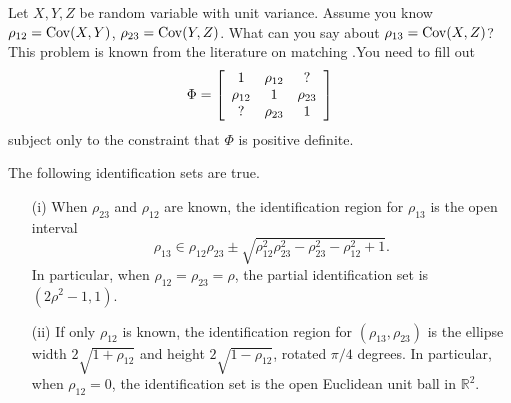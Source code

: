 Let $X,Y,Z$ be random variable with unit variance. Assume you know
$\rho_{12}=\operatorname{Cov}(X,Y)$, $\rho_{23}=\operatorname{Cov}(Y,Z)$. What can you say about
$\rho_{13}=\operatorname{Cov}(X,Z)$? This problem is known from the literature
on matching \parencite{Rassler2012-rp}.You need to fill out
\[
\Phi=\left[\begin{array}{ccc}
1 & \rho_{12} & ?\\
\rho_{12} & 1 & \rho_{23}\\
\text{\ensuremath{?}} & \rho_{23} & 1
\end{array}\right]
\]
subject only to the constraint that $\Phi$ is positive definite. 
\begin{proposition}
\label{prop:correlation identification}The following identification
sets are true.
\begin{itemize}
\item[(i)] When $\rho_{23}$ and $\rho_{12}$ are known, the identification region
for $\rho_{13}$ is the open interval
\begin{equation}
\rho_{13}\in\rho_{12}\rho_{23}\pm\sqrt{\rho_{12}^{2}\rho_{23}^{2}-\rho_{23}^{2}-\rho_{12}^{2}+1}.\label{eq:identification set correlation}
\end{equation}
In particular, when $\rho_{12}=\rho_{23}=\rho$, the partial identification
set is $(2\rho^{2}-1,1)$. 
\item[(ii)] If only $\rho_{12}$ is known, the identification region for $(\rho_{13},\rho_{23})$
is the ellipse width $2\sqrt{1+\rho_{12}}$ and height $2\sqrt{1-\rho_{12}}$,
rotated $\pi/4$ degrees. In particular, when $\rho_{12}=0$, the
identification set is the open Euclidean unit ball in $\mathbb{R}^{2}$.
\end{itemize}
\end{proposition}

